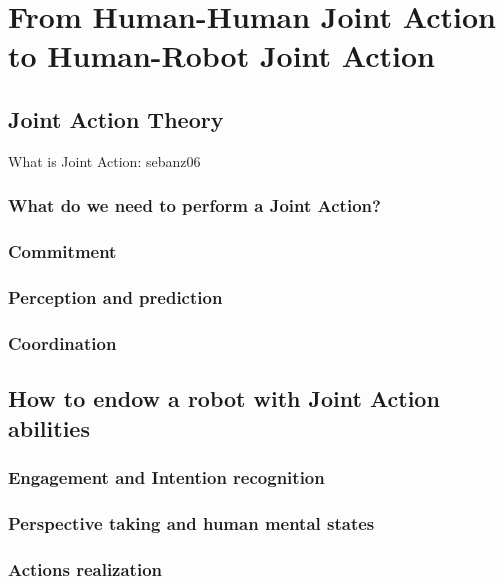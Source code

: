 \documentclass[a4paper,11pt,twoside]{StyleThese}
\begin{document}
\setcounter{chapter}{0} %
\dominitoc
\faketableofcontents
\fi

\chapter{From Human-Human Joint Action to Human-Robot Joint Action}
\minitoc

\section{Joint Action Theory}

What is Joint Action: sebanz06

\subsection{What do we need to perform a Joint Action?}

\subsection{Commitment}

\subsection{Perception and prediction}

\subsection{Coordination}



\section{How to endow a robot with Joint Action abilities}

\subsection{Engagement and Intention recognition}

\subsection{Perspective taking and human mental states}

\subsection{Actions realization}
\end{document}
